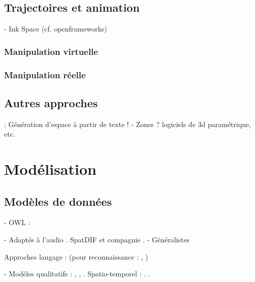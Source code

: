 \documentclass[french,12pt]{article}
\begin{document}
\subsection{Trajectoires et animation}
- Ink Space (cf. openframeworks)
\cite{santosa_direct_2013}
\cite{kazi_kitty:_2014,scott_physink:_2013}

\cite{garcia_jeremie_processing_2015,garcia_towards_2015}
\cite{wakefield_cosm:_2011}
\cite{wagner_introducing_2014}
\cite{melchior_authoring_2005} 
\cite{bresson_spatial_2012}
\cite{wozniewski_spatosc:_2012}
\cite{favory_trajectoires:_2015}
\cite{casas_4d_2013}


\subsubsection{Manipulation virtuelle}
\cite{jacob_design_2014} %
\cite{cohen_interface_1999}
\subsubsection{Manipulation réelle}
\cite{grossman_interface_2003}


\subsection{Autres approches}
\cite{andriamarozakaniaina_du_2012} : Génération d'espace à partir de texte !
\cite{van_nort_lom_2006}
 - Zones ? logiciels de 3d paramétrique, etc.

\section{Modélisation}
\cite{porter_handbook_2008}
\cite{grenon_formal_2003}
\cite{zhang_timed_2014}
\cite{benford_spatial_1993}

\cite{matlage_every_2011}
\subsection{Modèles de données}
- OWL : \cite{mefteh_approche_2013}

- Adaptés à l'audio
. SpatDIF et compagnie \cite{peters_spatial_2013}\cite{kendall_towards_2008}
. \cite{kondoz_object-based_2014}
- Généralistes
\cite{hudak_arrows_2003}

Approches langage : (pour reconnaissance : \cite{spranger_recruitment_2011}\cite{spranger_emergent_2012}, )

- Modèles qualitatifs : \cite{chen_survey_2015}, \cite{bhatt_geospatial_2014}, \cite{schlieder_qualitative_1996,dorr_qualitative_2014}. Spatio-temporel : \cite{hazarika_qualitative_2012}. \cite{clementini_global_1997}.
\end{document}
